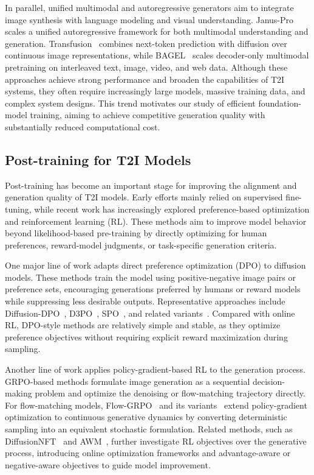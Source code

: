 In parallel, unified multimodal and autoregressive generators aim to integrate image synthesis with language modeling and visual understanding. Janus-Pro~\citep{chen2025januspro} scales a unified autoregressive framework for both multimodal understanding and generation. Transfusion~\citep{zhou2024transfusion} combines next-token prediction with diffusion over continuous image representations, while BAGEL~\citep{deng2025BAGEL} scales decoder-only multimodal pretraining on interleaved text, image, video, and web data. Although these approaches achieve strong performance and broaden the capabilities of T2I systems, they often require increasingly large models, massive training data, and complex system designs. This trend motivates our study of efficient foundation-model training, aiming to achieve competitive generation quality with substantially reduced computational cost.

\subsection{Post-training for T2I Models}

Post-training has become an important stage for improving the alignment and generation quality of T2I models. Early efforts mainly relied on supervised fine-tuning, while recent work has increasingly explored preference-based optimization and reinforcement learning (RL). These methods aim to improve model behavior beyond likelihood-based pre-training by directly optimizing for human preferences, reward-model judgments, or task-specific generation criteria.

One major line of work adapts direct preference optimization (DPO) to diffusion models. These methods train the model using positive-negative image pairs or preference sets, encouraging generations preferred by humans or reward models while suppressing less desirable outputs. Representative approaches include Diffusion-DPO~\citep{wallace2024diffusion}, D3PO~\citep{yang2024using}, SPO~\citep{liang2025aesthetic}, and related variants~\citep{yuan2024self,yang2024dense,li2024aligning,hong2026margin}. Compared with online RL, DPO-style methods are relatively simple and stable, as they optimize preference objectives without requiring explicit reward maximization during sampling.

Another line of work applies policy-gradient-based RL to the generation process. GRPO-based methods formulate image generation as a sequential decision-making problem and optimize the denoising or flow-matching trajectory directly. For flow-matching models, Flow-GRPO~\citep{liu2025flow} and its variants~\citep{li2025mixgrpo,wang2025pref} extend policy-gradient optimization to continuous generative dynamics by converting deterministic sampling into an equivalent stochastic formulation. Related methods, such as DiffusionNFT~\citep{zheng2025diffusionnft} and AWM~\citep{xue2025advantage}, further investigate RL objectives over the generative process, introducing online optimization frameworks and advantage-aware or negative-aware objectives to guide model improvement.

